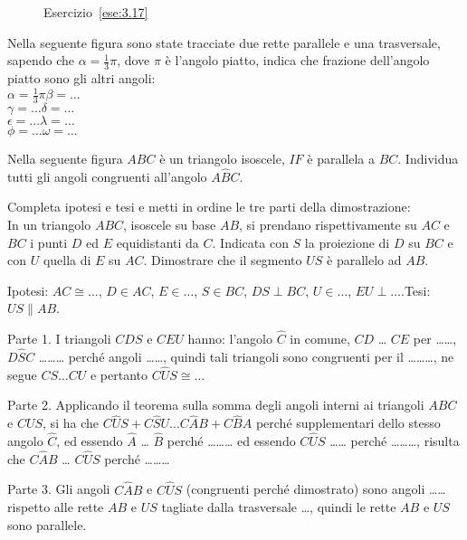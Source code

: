 \begin{figure}[htb]
\centering
\caption{Esercizio~\ref{ese:3.17}}\label{fig:ese3.17}
\end{figure}

\begin{esercizio}
\label{ese:3.18}
Nella seguente figura sono state tracciate due rette parallele e una trasversale, sapendo che $\alpha=\frac{1}{3}\pi$, dove $\pi$ è l'angolo piatto, indica che frazione dell'angolo piatto sono gli altri angoli:\\
$\alpha=\frac{1}{3}\pi$\tab\tab $\beta = \ldots$\\
$\gamma=\ldots$\tab\tab $\delta = \ldots$\\
$\epsilon=\ldots$\tab\tab $\lambda = \ldots$\\
$\phi=\ldots$\tab\tab $\omega = \ldots$
\end{esercizio}

\begin{esercizio}
\label{ese:3.19}
Nella seguente figura $ABC$ è un triangolo isoscele, $IF$ è parallela a $BC$. Individua tutti gli angoli congruenti all'angolo $A\widehat{B}C$.
\end{esercizio}

\begin{esercizio}
\label{ese:3.20}
Completa ipotesi e tesi e metti in ordine le tre parti della dimostrazione:\\
In un triangolo $ABC$, isoscele su base $AB$, si prendano rispettivamente su $AC$ e $BC$ i punti $D$ ed $E$ equidistanti da $C$. Indicata con $S$ la proiezione di $D$ su $BC$ e con $U$ quella di $E$ su $AC$. Dimostrare che il segmento $US$ è parallelo ad $AB$.

\noindent Ipotesi: $AC\cong \ldots$, $D\in AC$, $E\in \ldots$, $S\in BC$, $DS\perp BC$, $U\in \ldots$, $EU\perp \ldots$.\tab Tesi: $US\parallel AB$.

Parte 1. I triangoli $CDS$ e $CEU$  hanno: l'angolo $\widehat{C}$ in comune, $CD$ \ldots{} $CE$ per \ldots\ldots{}, $D\widehat{S}C$ \ldots\ldots\ldots{} perché angoli \ldots\ldots{}, quindi tali triangoli sono congruenti per il \ldots\ldots\ldots{}, ne segue $CS \ldots CU$ e pertanto $C\widehat{U}S\cong \ldots$

Parte 2. Applicando il teorema sulla somma degli angoli interni ai triangoli $ABC$ e $CUS$, si ha che $C\widehat{U}S + C\widehat{S}U \ldots{} C\widehat{A}B + C\widehat{B}A$ perché supplementari dello stesso angolo $\widehat{C}$, ed essendo $\widehat{A}$ \dots{} $\widehat{B}$ perché \ldots\ldots\ldots{} ed essendo $C\widehat{U}S$ \ldots\ldots{} perché \ldots\ldots\ldots{}, risulta che $C\widehat{A}B$ \ldots{} $C\widehat{U}S$ perché \ldots\ldots\ldots{}

Parte 3. Gli angoli $C\widehat{A}B$ e $C\widehat{U}S$ (congruenti perché dimostrato) sono angoli \ldots\ldots rispetto alle rette $AB$ e $US$ tagliate dalla trasversale \ldots, quindi le rette $AB$ e $US$ sono parallele.
\end{esercizio}

